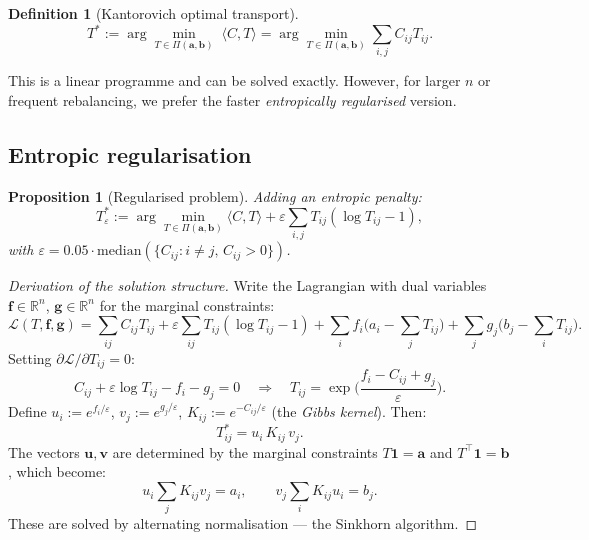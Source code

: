\documentclass[11pt]{article}
\newtheorem{proposition}[theorem]{Proposition}
\newtheorem{definition}[theorem]{Definition}
\newcommand{\R}{\mathbb{R}}
\begin{document}
\begin{definition}[Kantorovich optimal transport]\label{def:kant}
\begin{equation}\label{eq:kant}
T^* := \arg\min_{T\in\Pi(\bm{a},\bm{b})}\;\langle C,T\rangle
  = \arg\min_{T\in\Pi(\bm{a},\bm{b})}\sum_{i,j}C_{ij}T_{ij}.
\end{equation}
\end{definition}

This is a linear programme and can be solved exactly.  However,
for larger $n$ or frequent rebalancing, we prefer the faster
\emph{entropically regularised} version.

\subsection{Entropic regularisation}

\begin{proposition}[Regularised problem]\label{prop:entropic}
Adding an entropic penalty:
\begin{equation}\label{eq:ot_reg}
T_\varepsilon^* := \arg\min_{T\in\Pi(\bm{a},\bm{b})}
  \langle C,T\rangle + \varepsilon\sum_{i,j}T_{ij}(\log T_{ij}-1),
\end{equation}
with $\varepsilon = 0.05\cdot\mathrm{median}(\{C_{ij}:i\neq j,\,C_{ij}>0\})$.
\end{proposition}

\begin{proof}[Derivation of the solution structure]
Write the Lagrangian with dual variables $\bm{f}\in\R^n$, $\bm{g}\in\R^n$
for the marginal constraints:
\begin{equation}
\mathcal{L}(T,\bm{f},\bm{g}) = \sum_{ij}C_{ij}T_{ij}
  + \varepsilon\sum_{ij}T_{ij}(\log T_{ij}-1)
  + \sum_i f_i\Big(a_i - \sum_j T_{ij}\Big)
  + \sum_j g_j\Big(b_j - \sum_i T_{ij}\Big).
\end{equation}
Setting $\partial\mathcal{L}/\partial T_{ij}=0$:
\begin{equation}
C_{ij} + \varepsilon\log T_{ij} - f_i - g_j = 0
\quad\Longrightarrow\quad
T_{ij} = \exp\!\Big(\frac{f_i-C_{ij}+g_j}{\varepsilon}\Big).
\end{equation}
Define $u_i:=e^{f_i/\varepsilon}$, $v_j:=e^{g_j/\varepsilon}$,
$K_{ij}:=e^{-C_{ij}/\varepsilon}$ (the \emph{Gibbs kernel}).  Then:
\begin{equation}\label{eq:Tstar_form}
\boxed{T_{ij}^* = u_i\,K_{ij}\,v_j.}
\end{equation}
The vectors $\bm{u},\bm{v}$ are determined by the marginal constraints
$T\bm{1}=\bm{a}$ and $T^\top\bm{1}=\bm{b}$, which become:
\begin{equation}
u_i\sum_j K_{ij}v_j = a_i,\qquad
v_j\sum_i K_{ij}u_i = b_j.
\end{equation}
These are solved by alternating normalisation --- the Sinkhorn algorithm.
\end{proof}
\end{document}

